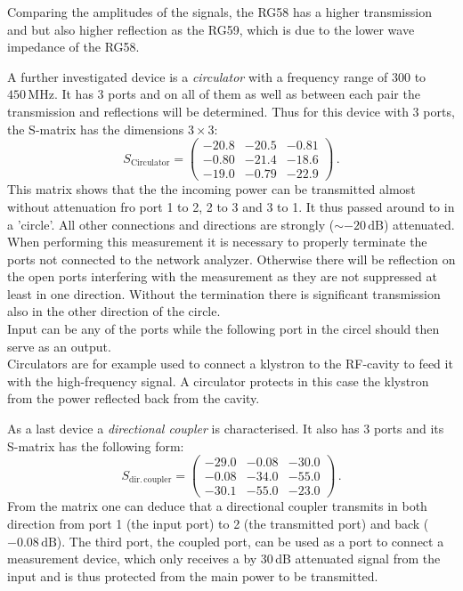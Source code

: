 Comparing the amplitudes of the signals, the RG58 has a higher transmission and but also higher reflection as the RG59, which is due to the lower wave impedance of the RG58.
\par
A further investigated device is a \textit{circulator} with a frequency range of $300$ to $450\,\mathrm{MHz}$. It has 3 ports and on all of them as well as between each pair the transmission and reflections will be determined. Thus for this device with 3 ports, the S-matrix has the dimensions $3\times3$:
$$S_{\mathrm{Circulator}}=\begin{pmatrix}-20.8&-20.5&-0.81\\-0.80&-21.4&-18.6\\-19.0&-0.79&-22.9\end{pmatrix}\,.$$
This matrix shows that the the incoming power can be transmitted almost without attenuation fro port 1 to 2, 2 to 3 and 3 to 1. It thus passed around to in a 'circle'. All other connections and directions are strongly ($\sim -20\,\mathrm{dB}$) attenuated.\\
When performing this measurement it is necessary to properly terminate the ports not connected to the network analyzer. Otherwise there will be reflection on the open ports interfering with the measurement as they are not suppressed at least in one direction. Without the termination there is significant transmission also in the other direction of the circle.\\
Input can be any of the ports while the following port in the circel should then serve as an output.\\
Circulators are for example used to connect a klystron to the RF-cavity to feed it with the high-frequency signal. A circulator protects in this case the klystron from the power reflected back from the cavity.
\par
As a last device a \textit{directional coupler} is characterised. It also has 3 ports and its S-matrix has the following form:
$$S_{\mathrm{dir.\,coupler}}=\begin{pmatrix}-29.0&-0.08&-30.0\\-0.08&-34.0&-55.0\\-30.1&-55.0&-23.0\end{pmatrix}\,.$$
From the matrix one can deduce that a directional coupler transmits in both direction from port 1 (the input port) to 2 (the transmitted port) and back ($-0.08\,\mathrm{dB}$). 
The third port, the coupled port, can be used as a port to connect a measurement device, which only receives a by 30\,dB attenuated signal from the input and is thus protected from the main power to be transmitted. 
